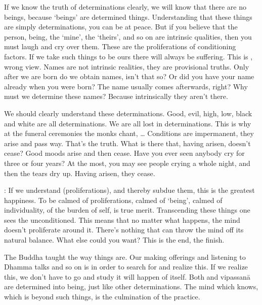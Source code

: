 If we know the truth of determinations clearly, we will know that there are no beings, because `beings' are determined things. Understanding that these things are simply determinations, you can be at peace. But if you believe that the person, being, the `mine', the `theirs', and so on are intrinsic qualities, then you must laugh and cry over them. These are the proliferations of conditioning factors. If we take such things to be ours there will always be suffering. This is , wrong view. Names are not intrinsic realities, they are provisional truths. Only after we are born do we obtain names, isn't that so? Or did you have your name already when you were born? The name usually comes afterwards, right? Why must we determine these names? Because intrinsically they aren't there. 

We should clearly understand these determinations. Good, evil, high, low, black and white are all determinations. We are all lost in determinations. This is why at the funeral ceremonies the monks chant,  \ldots{} Conditions are impermanent, they arise and pass way. That's the truth. What is there that, having arisen, doesn't cease? Good moods arise and then cease. Have you ever seen anybody cry for three or four years? At the most, you may see people crying a whole night, and then the tears dry up. Having arisen, they cease.

: If we understand  (proliferations), and thereby subdue them, this is the greatest happiness. To be calmed of proliferations, calmed of `being', calmed of individuality, of the burden of self, is true merit. Transcending these things one sees the unconditioned. This means that no matter what happens, the mind doesn't proliferate around it. There's nothing that can throw the mind off its natural balance. What else could you want? This is the end, the finish. 

The Buddha taught the way things are. Our making offerings and listening to Dhamma talks and so on is in order to search for and realize this. If we realize this, we don't have to go and study  it will happen of itself. Both  and vipassan\=a are determined into being, just like other determinations. The mind which knows, which is beyond such things, is the culmination of the practice. 

